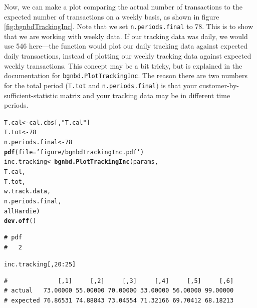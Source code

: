 \documentclass[10pt, letterpaper, onecolumn, oneside, final]{article}\usepackage[]{graphicx}\usepackage[]{color}
\makeatletter
\newcommand{\hlnum}[1]{\textcolor[rgb]{0.686,0.059,0.569}{#1}}%
\newcommand{\hlstr}[1]{\textcolor[rgb]{0.192,0.494,0.8}{#1}}%
\newcommand{\hlopt}[1]{\textcolor[rgb]{0,0,0}{#1}}%
\newcommand{\hlstd}[1]{\textcolor[rgb]{0.345,0.345,0.345}{#1}}%
\newcommand{\hlkwb}[1]{\textcolor[rgb]{0.69,0.353,0.396}{#1}}%
\newcommand{\hlkwc}[1]{\textcolor[rgb]{0.333,0.667,0.333}{#1}}%
\newcommand{\hlkwd}[1]{\textcolor[rgb]{0.737,0.353,0.396}{\textbf{#1}}}%
\newenvironment{kframe}{%
 \def\at@end@of@kframe{}%
 \ifinner\ifhmode%
  \def\at@end@of@kframe{\end{minipage}}%
  \begin{minipage}{\columnwidth}%
 \fi\fi%
 \def\FrameCommand##1{\hskip\@totalleftmargin \hskip-\fboxsep
 \colorbox{shadecolor}{##1}\hskip-\fboxsep
     \hskip-\linewidth \hskip-\@totalleftmargin \hskip\columnwidth}%
 \MakeFramed {\advance\hsize-\width
   \@totalleftmargin\z@ \linewidth\hsize
   \@setminipage}}%
 {\par\unskip\endMakeFramed%
 \at@end@of@kframe}
\newenvironment{knitrout}{}{} %
\makeatother
\begin{document}
Now, we can make a plot comparing the actual number of transactions to
the expected number of transactions on a weekly basis, as shown in
figure \ref{fig:bgnbdTrackingInc}. Note that we set
\texttt{n.periods.final} to 78. This is to show that we are working
with weekly data. If our tracking data was daily, we would use 546
here---the function would plot our daily tracking data against
expected daily transactions, instead of plotting our weekly tracking
data against expected weekly transactions. This concept may be a bit
tricky, but is explained in the documentation for
\texttt{bgnbd.PlotTrackingInc}. The reason there are two numbers for
the total period (\texttt{T.tot} and \texttt{n.periods.final}) is that
your customer-by-sufficient-statistic matrix and your tracking data
may be in different time periods.

\begin{knitrout}
\color{fgcolor}\begin{kframe}
\begin{alltt}
\hlstd{T.cal} \hlkwb{<-} \hlstd{cal.cbs[,}\hlstr{"T.cal"}\hlstd{]}
\hlstd{T.tot} \hlkwb{<-} \hlnum{78}
\hlstd{n.periods.final} \hlkwb{<-} \hlnum{78}
\hlkwd{pdf}\hlstd{(}\hlkwc{file} \hlstd{=} \hlstr{'figure/bgnbdTrackingInc.pdf'}\hlstd{)}
\hlstd{inc.tracking} \hlkwb{<-} \hlkwd{bgnbd.PlotTrackingInc}\hlstd{(params,}
                                      \hlstd{T.cal,}
                                      \hlstd{T.tot,}
                                      \hlstd{w.track.data,}
                                      \hlstd{n.periods.final,}
                                      \hlstd{allHardie)}
\hlkwd{dev.off}\hlstd{()}
\end{alltt}
\begin{verbatim}
# pdf 
#   2
\end{verbatim}
\begin{alltt}
\hlstd{inc.tracking[,}\hlnum{20}\hlopt{:}\hlnum{25}\hlstd{]}
\end{alltt}
\begin{verbatim}
#              [,1]     [,2]     [,3]     [,4]     [,5]     [,6]
# actual   73.00000 55.00000 70.00000 33.00000 56.00000 99.00000
# expected 76.86531 74.88843 73.04554 71.32166 69.70412 68.18213
\end{verbatim}
\end{kframe}
\end{knitrout}
\end{document}
